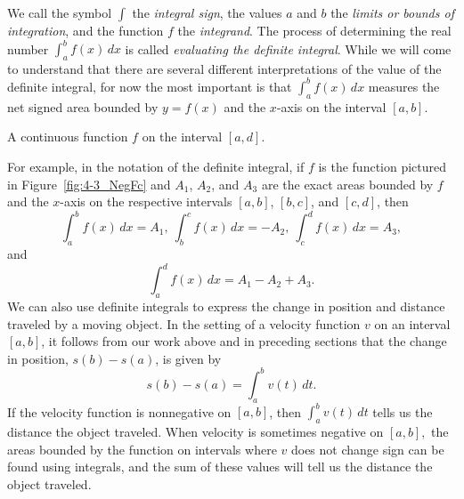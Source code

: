 
We call the symbol $\int$ the \emph{integral sign}, the values $a$ and $b$ the \emph{limits or bounds of integration}, and the function $f$ the \emph{integrand}.  The process of determining the real number $\int_a^b f(x) \, dx$ is called \emph{evaluating the definite integral}.  While we will come to understand that there are several different interpretations of the value of the definite integral, for now the most important is that $\int_a^b f(x) \, dx$ measures the net signed area bounded by $y = f(x)$ and the $x$-axis on the interval $[a,b]$.  

\begin{marginfigure} %
\caption{A continuous function $f$ on the interval $[a,d]$.} \label{fig:4-3_NegFc}
\end{marginfigure}

For example, in the notation of the definite integral, if $f$ is the function pictured in Figure~\ref{fig:4-3_NegFc} and $A_1$, $A_2$, and $A_3$ are the exact areas bounded by $f$ and the $x$-axis on the respective intervals $[a,b]$, $[b,c]$, and $[c,d]$, then
\[ \int_a^b f(x) \, dx = A_1, \ \int_b^c f(x) \, dx = -A_2, \ \int_c^d f(x) \, dx = A_3, \]
and
\[ \int_a^d f(x) \, dx = A_1 - A_2 + A_3. \]
We can also use definite integrals to express the change in position and distance traveled by a moving object.  In the setting of a velocity function $v$ on an interval $[a,b]$, it follows from our work above and in preceding sections that the change in position, $s(b) - s(a)$, is given by
\[ s(b) - s(a) = \int_a^b v(t) \, dt. \]
If the velocity function is nonnegative on $[a,b]$, then $\int_a^b v(t) \,dt$ tells us the distance the object traveled.  When velocity is sometimes negative on $[a,b],$ the areas bounded by the function on intervals where $v$ does not change sign can be found using integrals, and the sum of these values will tell us the distance the object traveled. 

